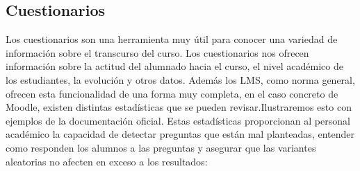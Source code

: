 \subsection{Cuestionarios} 
Los cuestionarios son una herramienta muy útil para conocer una variedad de información sobre el transcurso del curso. Los cuestionarios nos ofrecen información sobre la actitud del alumnado hacia el curso, el nivel académico de los estudiantes, la evolución y otros datos. Además los LMS, como norma general, ofrecen esta funcionalidad de una forma muy completa, en el caso concreto de Moodle, existen distintas estadísticas que se pueden revisar.Ilustraremos esto con ejemplos de la documentación oficial\cite{estadisticas-examen}. Estas estadísticas proporcionan al personal académico la capacidad de detectar preguntas que están mal planteadas, entender como responden los alumnos a las preguntas y asegurar que las variantes aleatorias no afecten en exceso a los resultados:
